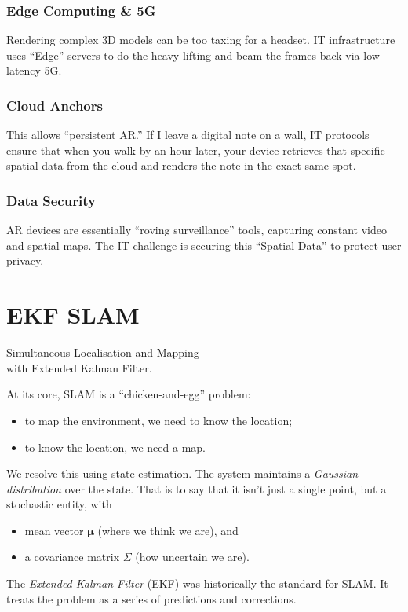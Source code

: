 \documentclass[11pt]{article}
\begin{document}
\subsubsection{Edge Computing \& 5G}
\label{sec:orgb91c32a}
Rendering complex 3D models can be too taxing for a
headset.  IT infrastructure uses ``Edge'' servers to do
the heavy lifting and beam the frames back via
low-latency 5G.
\subsubsection{Cloud Anchors}
\label{sec:orge2e400e}
This allows ``persistent AR.''  If I leave a digital note
on a wall, IT protocols ensure that when you walk by an
hour later, your device retrieves that specific spatial
data from the cloud and renders the note in the exact
same spot.
\subsubsection{Data Security}
\label{sec:org9ed03a0}
AR devices are essentially ``roving surveillance'' tools,
capturing constant video and spatial maps. The IT
challenge is securing this ``Spatial Data'' to protect
user privacy.
\section{EKF SLAM}
\label{sec:org4b775b5}

Simultaneous Localisation and Mapping \\
with Extended Kalman Filter.

At its core, SLAM is a ``chicken-and-egg'' problem:
\begin{itemize}
\item to map the environment, we need to know the location;
\item to know the location, we need a map.
\end{itemize}

We resolve this using state estimation.  The system
maintains a \emph{Gaussian distribution} over the state.
That is to say that it isn't just a single point, but a
stochastic entity, with
\begin{itemize}
\item mean vector \(\boldsymbol{\mu}\) (where we think we
are), and
\item a covariance matrix \(\Sigma\) (how uncertain we are).
\end{itemize}

The \emph{Extended Kalman Filter} (EKF) was historically the
standard for SLAM.  It treats the problem as a series
of predictions and corrections.
\end{document}
